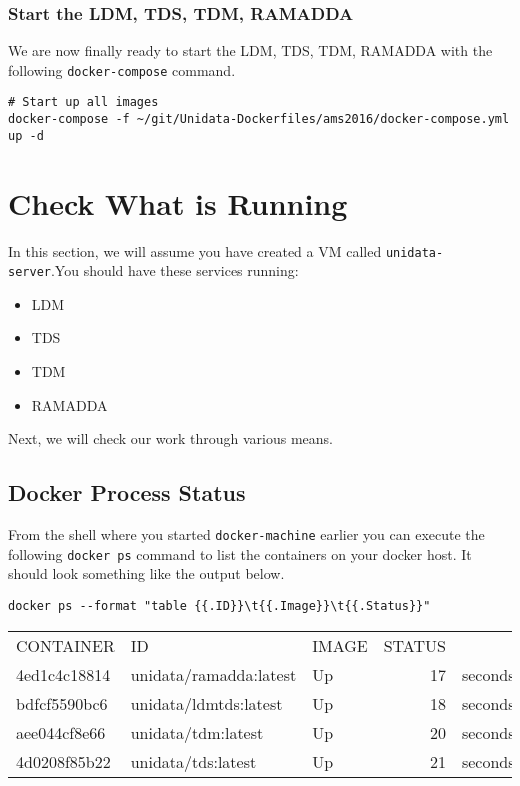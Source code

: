 \documentclass[11pt]{article}
\begin{document}
\subsubsection{Start the LDM, TDS, TDM, RAMADDA}
\label{sec:orgheadline36}

We are now finally ready to start the LDM, TDS, TDM, RAMADDA with the following \texttt{docker-compose} command.

\begin{verbatim}
# Start up all images
docker-compose -f ~/git/Unidata-Dockerfiles/ams2016/docker-compose.yml up -d
\end{verbatim}

\section{\label{orgtarget5} Check What is Running}
\label{sec:orgheadline44}

In this section, we will assume you have created a VM called \texttt{unidata-server}.You should have these services running:

\begin{itemize}
\item LDM
\item TDS
\item TDM
\item RAMADDA
\end{itemize}

Next, we will check our work through various means.

\subsection{Docker Process Status}
\label{sec:orgheadline38}

From the shell where you started \texttt{docker-machine} earlier you can execute the following \texttt{docker ps} command to list the containers on your docker host. It should look something like the output below.

\begin{verbatim}
docker ps --format "table {{.ID}}\t{{.Image}}\t{{.Status}}"
\end{verbatim}

\begin{center}
\begin{tabular}{lllrl}
CONTAINER & ID & IMAGE & STATUS & \\
4ed1c4c18814 & unidata/ramadda:latest & Up & 17 & seconds\\
bdfcf5590bc6 & unidata/ldmtds:latest & Up & 18 & seconds\\
aee044cf8e66 & unidata/tdm:latest & Up & 20 & seconds\\
4d0208f85b22 & unidata/tds:latest & Up & 21 & seconds\\
\end{tabular}
\end{center}
\end{document}
